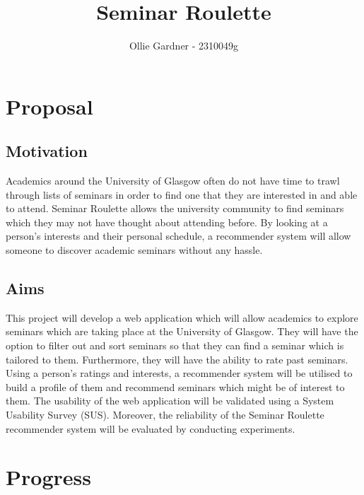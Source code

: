 \documentclass[11pt]{article}
\title{Seminar Roulette}
\author{Ollie Gardner - 2310049g}
\begin{document}
\maketitle

\section{Proposal}\label{proposal}

\subsection{Motivation}\label{motivation}

Academics around the University of Glasgow often do not have time to trawl through lists of seminars in order to find one that they are interested in and able to attend. Seminar Roulette allows the university community to find seminars which they may not have thought about attending before. By looking at a person's interests and their personal schedule, a recommender system will allow someone to discover academic seminars without any hassle.

\subsection{Aims}\label{aims}

This project will develop a web application which will allow academics to explore seminars which are taking place at the University of Glasgow. They will have the option to filter out and sort seminars so that they can find a seminar which is tailored to them. Furthermore, they will have the ability to rate past seminars. Using a person's ratings and interests, a recommender system will be utilised to build a profile of them and recommend seminars which might be of interest to them. The usability of the web application will be validated using a System Usability Survey (SUS). Moreover, the reliability of the Seminar Roulette recommender system will be evaluated by conducting experiments.

\section{Progress}\label{progress}
\end{document}
